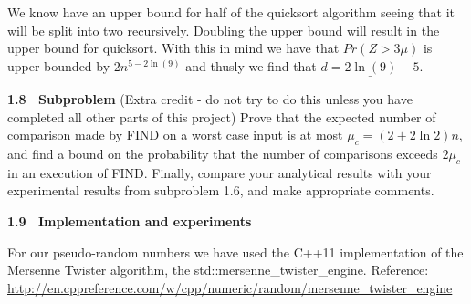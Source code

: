 \documentclass[article,a4paper,oneside]{article}
\newcommand{\+}[1]{\ensuremath{\boldsymbol{#1}}}
\begin{document}
We know have an upper bound for half of the quicksort algorithm seeing that it will be split into two recursively. Doubling the upper bound will result in the upper bound for quicksort. With this in mind we have that $Pr(Z > 3\mu)$ is upper bounded by $2n^{5-2\ln(9)}$ and thusly we find that $\underline{d = 2\ln(9) - 5}$.

{\bf 1.8 \ Subproblem} (Extra credit - do not try to do this unless
you have completed all other parts of this project) Prove
that the expected number of comparison made by FIND on a worst case
input is at most $\mu_c=(2+2\ln 2)n$, and find a bound on the
probability that the number of comparisons exceeds $2\mu_c$ in an
execution of FIND.  Finally, compare your analytical results with your
experimental results from subproblem 1.6, and make appropriate
comments.



{\bf 1.9 \ Implementation and experiments}

For our pseudo-random numbers we have used the C++11 implementation of the Mersenne Twister algorithm, the std::mersenne\_twister\_engine. Reference: \url{ http://en.cppreference.com/w/cpp/numeric/random/mersenne_twister_engine}

\end{document}
